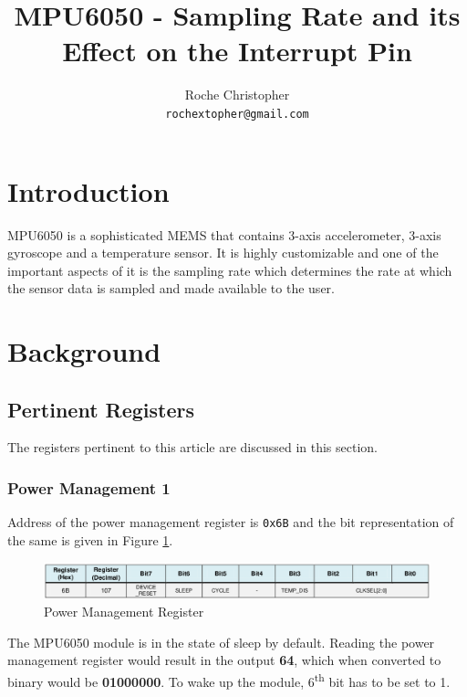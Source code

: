 \documentclass{article}
\title{MPU6050 - Sampling Rate and its Effect on the Interrupt Pin}
\author{Roche Christopher \\ \texttt{rochextopher@gmail.com}}
\begin{document}
	\maketitle

	
	\section{Introduction}
	\label{sec:introduction}
	MPU6050 is a sophisticated MEMS that contains 3-axis accelerometer, 3-axis gyroscope and a temperature sensor. It is highly customizable and one of the important aspects of it is the sampling rate which determines the rate at which the sensor data is sampled and made available to the user. 
	
	\section{Background}
	
	\subsection{Pertinent Registers}
	The registers pertinent to this article are discussed in this section. 
	
	\subsubsection{Power Management 1 }
	Address of the power management register is \texttt{0x6B} and the bit representation of the same is given in Figure \ref{fig:pwr_mgmt_reg}.  
	\begin{figure}[h]
		\centering
		\includegraphics[width=\textwidth]{figs/reg_pwr_mgmt.png}
		\caption{Power Management Register \cite{mpu6050-register-map}}
		\label{fig:pwr_mgmt_reg}
	\end{figure}

	The MPU6050 module is in the state of sleep by default. Reading the power management register would result in the output \textbf{64}, which when converted to binary would be \textbf{01000000}. To wake up the module, 6\textsuperscript{th} bit has to be set to 1.
	
\end{document}

